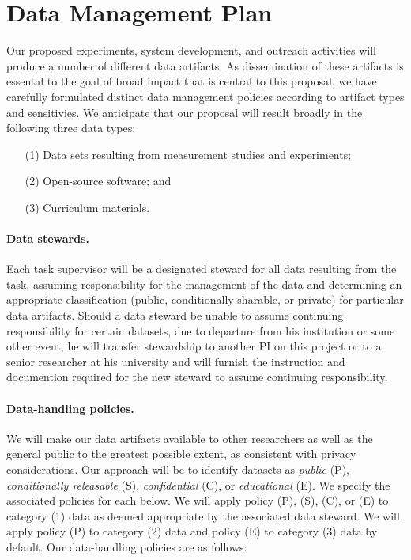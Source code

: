 \section*{Data Management Plan} 

Our proposed experiments, system development, and outreach activities will
produce a number of different data artifacts. As dissemination of these
artifacts is essental to the goal of broad impact that is central to this
proposal, we have carefully formulated distinct data management policies
according to artifact types and sensitivies. We anticipate that our proposal
will result broadly in the following three data types:

\begin{enumerate}
\item[(1)] Data sets resulting from measurement studies and experiments;
\item[(2)] Open-source software; and
\item[(3)] Curriculum materials.
\end{enumerate}

\paragraph{Data stewards.} Each task supervisor will be a designated steward for
all data resulting from the task, assuming responsibility for the management of
the data and determining an appropriate classification (public, conditionally
sharable, or private) for particular data artifacts. Should a data steward be
unable to assume continuing responsibility for certain datasets, due to
departure from his institution or some other event, he will transfer stewardship
to another PI on this project or to a senior researcher at his university and
will furnish the instruction and documention required for the new steward to
assume continuing responsibility.

\paragraph{Data-handling policies.} We will make our data artifacts available to
other researchers as well as the general public to the greatest possible extent,
as consistent with privacy considerations. Our approach will be to identify
datasets as {\em public} (P), {\em conditionally releasable} (S), {\em
confidential} (C), or {\em educational} (E). We specify the associated policies
for each below. We will apply policy (P), (S), (C), or (E) to category (1) data
as deemed appropriate by the associated data steward. We will apply policy (P)
to category (2) data and policy (E) to category (3) data by default. Our
data-handling policies are as follows:

